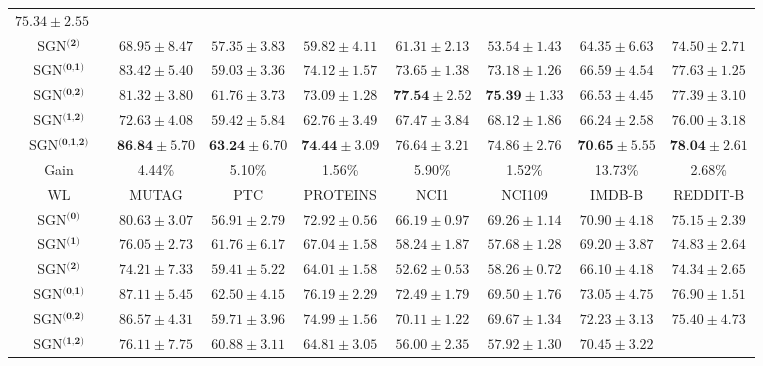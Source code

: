 \documentclass[10pt,journal,compsoc]{IEEEtran}
\begin{document}
\begin{table*}[!t]
\begin{tabular}{c|cccccccc}
$75.34\pm{2.55}$\\
\multicolumn{2}{c|}{SGN$^{\textbf{(2)}}$}&$68.95\pm{8.47}$&$57.35\pm{3.83}$&$59.82\pm{4.11}$&$61.31\pm{2.13}$&  $53.54\pm{1.43}$&$64.35\pm{6.63}$&
$74.50\pm{2.71}$\\
\multicolumn{2}{c|}{SGN$^{\textbf{(0,1)}}$}&$83.42\pm{5.40}$&$59.03\pm{3.36}$&$74.12\pm{1.57}$&$73.65\pm{1.38}$&$73.18\pm{1.26}$&$66.59\pm{4.54}$&
$77.63\pm{1.25}$\\
\multicolumn{2}{c|}{SGN$^{\textbf{(0,2)}}$}&$81.32\pm{3.80}$&$61.76\pm{3.73}$&$73.09\pm{1.28}$&  $\textbf{77.54}\pm{2.52}$&$\textbf{75.39}\pm{1.33}$&$66.53\pm{4.45}$&
$77.39\pm{3.10}$\\
\multicolumn{2}{c|}{SGN$^{\textbf{(1,2)}}$}&$72.63\pm{4.08}$&$59.42\pm{5.84}$&$62.76\pm{3.49}$&$67.47\pm{3.84}$&$68.12\pm{1.86}$&$66.24\pm{2.58}$&
$76.00\pm{3.18}$\\
\multicolumn{2}{c|}{SGN$^{\textbf{(0,1,2)}}$}&$\textbf{86.84}\pm{5.70}$&$\textbf{63.24}\pm{6.70}$&  $\textbf{74.44}\pm{3.09}$&$76.64\pm{3.21}$&$74.86\pm{2.76}$&$\textbf{70.65}\pm{5.55}$&
$\textbf{78.04}\pm{2.61}$\\
\hline
\multicolumn{2}{c|}{Gain}&4.44\%&  5.10\%&  1.56\%&  5.90\%&  1.52\%&  13.73\%&  2.68\%\\
\hline
\multicolumn{2}{c|}{WL}&MUTAG&PTC&PROTEINS&NCI1&NCI109&IMDB-B&REDDIT-B\\
\hline
\multicolumn{2}{c|}{SGN$^{\textbf{(0)}}$}&$80.63\pm{3.07}$&  $56.91\pm{2.79}$&  $72.92\pm{0.56}$&  $66.19\pm{0.97}$&  $69.26\pm{1.14}$&$70.90\pm{4.18}$&
$75.15\pm{2.39}$\\
\multicolumn{2}{c|}{SGN$^{\textbf{(1)}}$}&$76.05\pm{2.73}$&  $61.76\pm{6.17}$&  $67.04\pm{1.58}$&  $58.24\pm{1.87}$&  $57.68\pm{1.28}$&$69.20\pm{3.87}$&
$74.83\pm{2.64}$\\
\multicolumn{2}{c|}{SGN$^{\textbf{(2)}}$}&$74.21\pm{7.33}$&  $59.41\pm{5.22}$&  $64.01\pm{1.58}$&  $52.62\pm{0.53}$&  $58.26\pm{0.72}$&$66.10\pm{4.18}$&
$74.34\pm{2.65}$\\
\multicolumn{2}{c|}{SGN$^{\textbf{(0,1)}}$}&$87.11\pm{5.45}$&  $62.50\pm{4.15}$&  $76.19\pm{2.29}$&  $72.49\pm{1.79}$&  $69.50\pm{1.76}$&$73.05\pm{4.75}$&
$76.90\pm{1.51}$\\
\multicolumn{2}{c|}{SGN$^{\textbf{(0,2)}}$}&$86.57\pm{4.31}$&  $59.71\pm{3.96}$&  $74.99\pm{1.56}$&  $70.11\pm{1.22}$&  $69.67\pm{1.34}$&$72.23\pm{3.13}$&
$75.40\pm{4.73}$\\
\multicolumn{2}{c|}{SGN$^{\textbf{(1,2)}}$}&$76.11\pm{7.75}$&  $60.88\pm{3.11}$&  $64.81\pm{3.05}$&  $56.00\pm{2.35}$&  $57.92\pm{1.30}$&$70.45\pm{3.22}$&

\end{tabular}
\end{table*}
\end{document}
